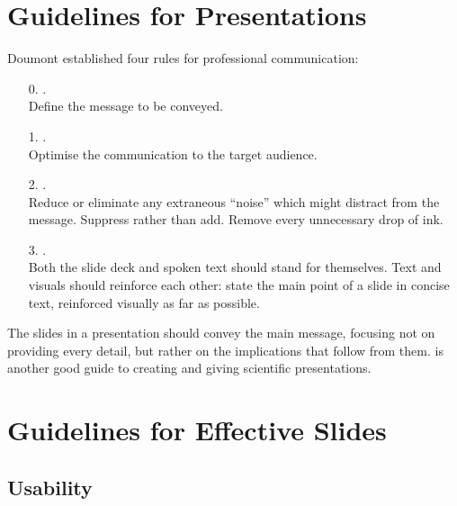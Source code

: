 \section{Guidelines for Presentations}

Doumont \parencite{ThreeLaws,cognitivestyle,Doumont-TreesMapsTheorems}
established four rules for professional communication:
\begin{enumerate}
\item[0.] . \\
  Define the message to be conveyed.

\item[1.] . \\
  Optimise the communication to the target audience.

\item[2.] . \\
  Reduce or eliminate any extraneous ``noise'' which might
  distract from the message. Suppress rather than add.
  Remove every unnecessary drop of ink.

\item[3.] . \\
  Both the slide deck and spoken text should stand for themselves.  
  Text and visuals should reinforce each other: state the main
  point of a slide in concise text, reinforced visually
  as far as possible.
\end{enumerate}
The slides in a presentation should convey the main message, focusing
not on providing every detail, but rather on the implications that
follow from them. \textcite{Alley-CraftScientificPresentations-2Ed}
is another good guide to creating and giving scientific presentations.






\section{Guidelines for Effective Slides}


\subsection{Usability}

